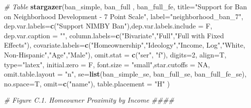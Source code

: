 \documentclass[]{article}
\newenvironment{Shaded}{\begin{snugshade}}{\end{snugshade}}
\newcommand{\CommentTok}[1]{\textcolor[rgb]{0.56,0.35,0.01}{\textit{#1}}}
\newcommand{\DataTypeTok}[1]{\textcolor[rgb]{0.13,0.29,0.53}{#1}}
\newcommand{\DecValTok}[1]{\textcolor[rgb]{0.00,0.00,0.81}{#1}}
\newcommand{\KeywordTok}[1]{\textcolor[rgb]{0.13,0.29,0.53}{\textbf{#1}}}
\newcommand{\NormalTok}[1]{#1}
\newcommand{\OtherTok}[1]{\textcolor[rgb]{0.56,0.35,0.01}{#1}}
\newcommand{\StringTok}[1]{\textcolor[rgb]{0.31,0.60,0.02}{#1}}
\begin{document}
\begin{Shaded}
\begin{Highlighting}[]
{{{\CommentTok{# Table}
\KeywordTok{stargazer}\NormalTok{(ban_simple,  ban_full , ban_full_fe, }\DataTypeTok{title=}\StringTok{"Support for Ban on Neighborhood Development - 7 Point Scale"}\NormalTok{, }\DataTypeTok{label=}\StringTok{"neighborhood_ban_7"}\NormalTok{,}
          \DataTypeTok{dep.var.labels=}\KeywordTok{c}\NormalTok{(}\StringTok{"Support NIMBY Ban"}\NormalTok{),}\DataTypeTok{dep.var.labels.include =}\NormalTok{ F, }\DataTypeTok{dep.var.caption =} \StringTok{""}\NormalTok{,}
          \DataTypeTok{column.labels=}\KeywordTok{c}\NormalTok{(}\StringTok{"Bivariate"}\NormalTok{,}\StringTok{"Full"}\NormalTok{,}\StringTok{"Full with Fixed Effects"}\NormalTok{),}
          \DataTypeTok{covariate.labels=}\KeywordTok{c}\NormalTok{(}\StringTok{"Homeownership"}\NormalTok{,}\StringTok{"Ideology"}\NormalTok{,}\StringTok{"Income, Log"}\NormalTok{,}\StringTok{"White, Non-Hispanic"}\NormalTok{,}\StringTok{"Age"}\NormalTok{,}\StringTok{"Male"}\NormalTok{),}
          \DataTypeTok{omit.stat =} \KeywordTok{c}\NormalTok{(}\StringTok{"ser"}\NormalTok{, }\StringTok{"f"}\NormalTok{), }\DataTypeTok{digits=}\DecValTok{2}\NormalTok{, }\DataTypeTok{align=}\NormalTok{T, }\DataTypeTok{type=}\StringTok{"latex"}\NormalTok{,}
          \DataTypeTok{initial.zero =}\NormalTok{ F,  }\DataTypeTok{font.size =} \StringTok{"small"}\NormalTok{,}\DataTypeTok{star.cutoffs =} \OtherTok{NA}\NormalTok{, }\DataTypeTok{omit.table.layout =} \StringTok{"n"}\NormalTok{,}
          \DataTypeTok{se=}\KeywordTok{list}\NormalTok{(ban_simple_se, ban_full_se, ban_full_fe_se), }\DataTypeTok{no.space=}\NormalTok{T, }\DataTypeTok{omit=}\KeywordTok{c}\NormalTok{(}\StringTok{"name"}\NormalTok{), }\DataTypeTok{table.placement =} \StringTok{"H"}\NormalTok{ )}


\CommentTok{# Figure C.1. Homeowner Proximity by Income ####}

}}}
\end{Highlighting}
\end{Shaded}
\end{document}

